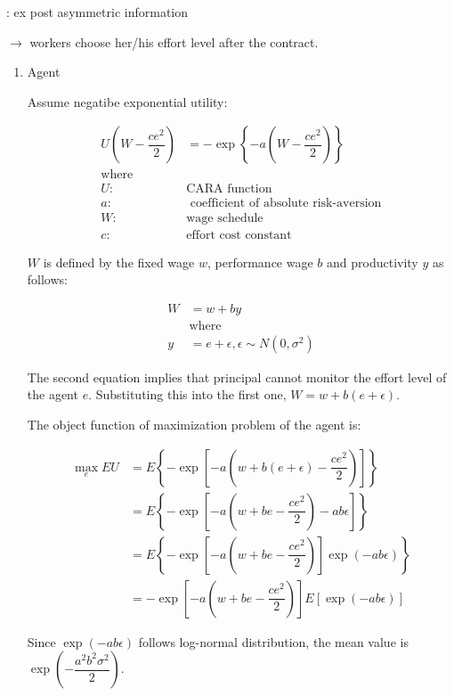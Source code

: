 \documentclass[dvipdfmx, 12pt]{article}
\begin{document}
: ex post asymmetric information

$\rightarrow$ workers choose her/his effort level after the contract.

\begin{enumerate}
  \item Agent

  Assume negatibe exponential utility:

  \begin{align*}
    U\left( W - \dfrac{c e^2}{2} \right) &= - \exp \left\{ -a \left( W - \dfrac{c e^2}{2} \right)\right\} \\
    \text{where}& \\
    U: & \text{CARA function} \\
    a: & \text{ coefficient of absolute risk-aversion} \\
    W: & \text{wage schedule} \\
    c: & \text{effort cost constant}
  \end{align*}

  $W$ is defined by the fixed wage $w$, performance wage $b$ and productivity $y$ as follows:

  \begin{align*}
    W &= w + by \\
    & \text{where} \\
    y &= e + \epsilon, \epsilon \sim N(0, \sigma^2)
  \end{align*}

  The second equation implies that principal cannot monitor the effort level of the agent $e$. Substituting this into the first one, $W = w + b(e + \epsilon)$.

  The object function of maximization problem of the agent is:

  \begin{align*}
    \max_e EU &= E \left\{ -\exp \left[-a\left(w + b (e + \epsilon) - \dfrac{ce^2}{2}\right)\right]\right\} \\
    &= E \left\{ -\exp \left[-a\left(w + be - \dfrac{ce^2}{2}\right) -ab \epsilon \right]\right\} \\
    &= E \left\{ -\exp \left[-a\left(w + be - \dfrac{ce^2}{2}\right) \right] \exp (- ab \epsilon)\right\} \\
    &= -\exp \left[-a\left(w + be - \dfrac{ce^2}{2}\right) \right] E[\exp (- ab \epsilon)]
  \end{align*}

  Since $\exp (-ab \epsilon)$ follows log-normal distribution, the mean value is $\exp \left( - \dfrac{a^2 b^2 \sigma^2}{2}\right)$.


\end{enumerate}
\end{document}
